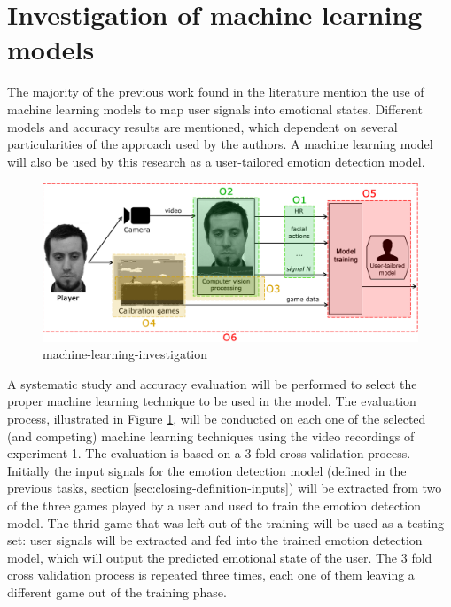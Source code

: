 \section{Investigation of machine learning models}

The majority of the previous work found in the literature mention the use of machine learning models to map user signals into emotional states. Different models and accuracy results are mentioned, which dependent on several particularities of the approach used by the authors. A machine learning model will also be used by this research as a user-tailored emotion detection model.

\begin{figure}[h]
    \centering
    \includegraphics[width=\textwidth]{figures/components-objectives.png}
    \caption{machine-learning-investigation}
    \label{fig:machine-learning-investigation}
\end{figure}

A systematic study and accuracy evaluation will be performed to select the proper machine learning technique to be used in the model. The evaluation process, illustrated in Figure \ref{fig:machine-learning-investigation}, will be conducted on each one of the selected (and competing) machine learning techniques using the video recordings of experiment 1. The evaluation is based on a 3 fold cross validation process. Initially the input signals for the emotion detection model (defined in the previous tasks, section \ref{sec:closing-definition-inputs}) will be extracted from two of the three games played by a user and used to train the emotion detection model. The thrid game that was left out of the training will be used as a testing set: user signals will be extracted and fed into the trained emotion detection model, which will output the predicted emotional state of the user. The 3 fold cross validation process is repeated three times, each one of them leaving a different game out of the training phase.

